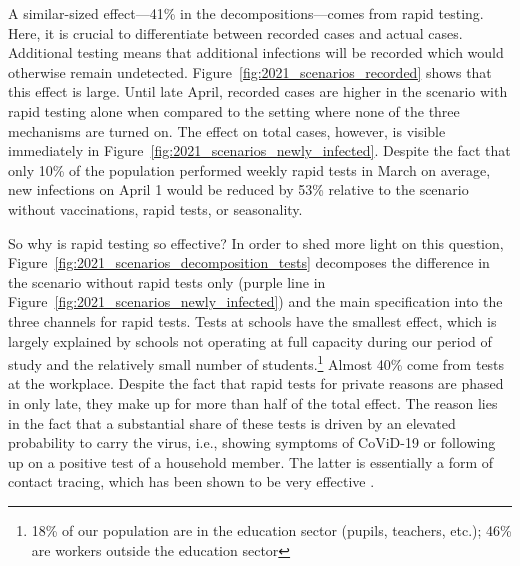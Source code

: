 A similar-sized effect---41\% in the decompositions---comes from rapid testing. Here, it
is crucial to differentiate between recorded cases and actual cases. Additional testing
means that additional infections will be recorded which would otherwise remain
undetected. Figure~\ref{fig:2021_scenarios_recorded} shows that this effect is large.
Until late April, recorded cases are higher in the scenario with rapid testing alone
when compared to the setting where none of the three mechanisms are turned on. The
effect on total cases, however, is visible immediately in
Figure~\ref{fig:2021_scenarios_newly_infected}. Despite the fact that only 10\%  of the
population performed weekly rapid tests in March on average, new infections on April 1
would be reduced by 53\% relative to the scenario without vaccinations, rapid tests, or
seasonality.

So why is rapid testing so effective? In order to shed more light on this question,
Figure~\ref{fig:2021_scenarios_decomposition_tests} decomposes the difference in the
scenario without rapid tests only (purple line in
Figure~\ref{fig:2021_scenarios_newly_infected}) and the main specification into the
three channels for rapid tests. Tests at schools have the smallest effect, which is
largely explained by schools not operating at full capacity during our period of study
and the relatively small number of students.\footnote{18\% of our population are in the
education sector (pupils, teachers, etc.); 46\% are workers outside the education sector}
Almost 40\% come from tests at the workplace. Despite the fact that rapid tests for
private reasons are phased in only late, they make up for more than half of the total
effect. The reason lies in the fact that a substantial share of these tests is driven by
an elevated probability to carry the virus, i.e., showing symptoms of CoViD-19 or
following up on a positive test of a household member. The latter is essentially a form
of contact tracing, which has been shown to be very effective \citep{Contreras2021,
Kretzschmar2020,FetzerGraeber2021}.


